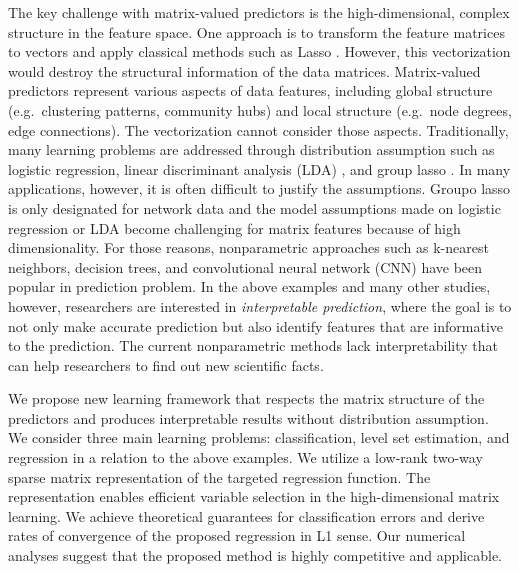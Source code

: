 \documentclass[11pt]{article}
\theoremstyle{definition}
\begin{document}
The key challenge with matrix-valued predictors is the high-dimensional, complex structure in the feature space. One approach is to transform the feature matrices to vectors and apply classical methods such as Lasso \citep{friedman2010regularization}. However, this vectorization would destroy the structural information of the data matrices. 
Matrix-valued predictors represent various aspects of data features, including global structure (e.g.\ clustering patterns, community hubs) and local structure (e.g.\ node degrees, edge connections).
The vectorization cannot consider those aspects.
Traditionally, many learning problems are addressed through distribution assumption such as logistic regression, linear discriminant analysis (LDA) \citep{agresti1998approximate}, and group lasso \citep{relion2019network}. In many applications, however, it is often difficult to  justify the assumptions. Groupo lasso is only designated for network data and the model assumptions made on logistic regression or LDA become challenging for matrix features because of high dimensionality.
For those reasons, nonparametric approaches such as k-nearest neighbors, decision trees, and convolutional neural network (CNN) \citep{chollet2015keras} have been popular in prediction problem.
In the above examples and many other studies, however, researchers are interested in {\it interpretable prediction}, where the goal is to not only make accurate prediction but also identify features that are informative to the prediction. The current nonparametric methods lack interpretability that can help researchers to find out new scientific facts. 

We propose new learning framework that respects the matrix structure of the predictors and produces interpretable results without distribution assumption. We consider three main learning problems: classification, level set estimation, and regression in a relation to the above examples.
We utilize a low-rank two-way sparse matrix representation of the targeted regression function. The representation enables efficient variable selection in the high-dimensional matrix learning. We achieve theoretical guarantees for classification errors and derive rates of convergence of the proposed regression in L1 sense. 
Our numerical analyses suggest that the proposed method is highly competitive and applicable.

\end{document}
